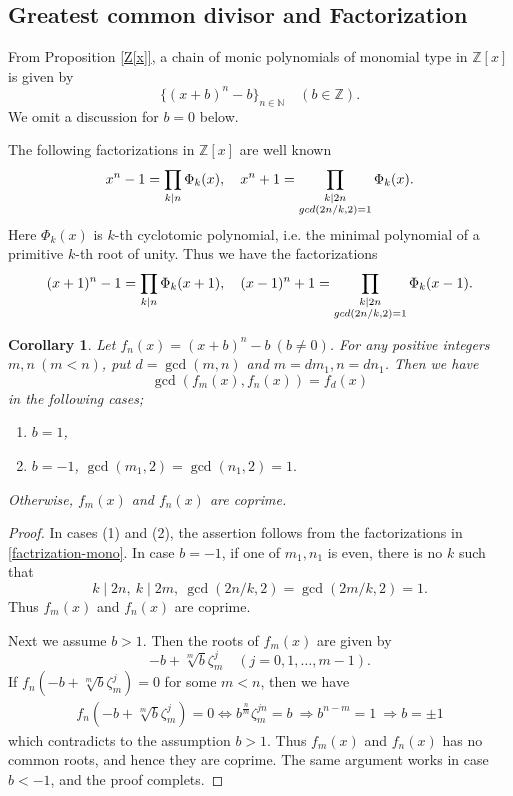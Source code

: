 \documentclass[a4paper, 11pt]{amsart}
\numberwithin{equation}{section}
\newtheorem{cor}[thm]{Corollary}
\theoremstyle{definition}
\newcommand{\Z}{\mathbb{Z}}
\newcommand{\N}{\mathbb{N}}
\begin{document}


\subsection{Greatest common divisor and Factorization}

From Proposition \ref{Z[x]}, a chain of monic polynomials of monomial type in $\Z[x]$ is given by
\[
\{(x+b)^n-b\}_{n\in \N}\quad (b\in \Z).
\]
We omit a discussion for $b=0$ below.

The following factorizations in $\Z[x]$ are well known 
\begin{equation*}
x^n-1 = \prod_{k \mid n} \Phi_k(x),\quad x^n+1 = \prod_{\substack{k\mid 2n \\ {\rm gcd} (2n/k, 2) = 1}} \Phi_k(x).
\end{equation*}
Here $\Phi_k(x)$ is $k$-th cyclotomic polynomial, i.e. the minimal polynomial of a  primitive $k$-th root of unity.
Thus we have the factorizations 
\begin{align}\label{factrization-mono}
(x+1)^n-1=\prod_{k \mid n} \Phi_k(x+1),\quad (x-1)^n+1=\prod_{\substack{k\mid 2n \\ {\rm gcd} (2n/k, 2) = 1}} \Phi_k(x-1).
\end{align}

\begin{cor}\label{gcd-mono}
Let $f_n(x)=(x+b)^n-b\ (b\neq 0)$.
For any positive integers $m, n\ (m<n)$, put $d=\gcd(m,n)$ and $m=dm_1, n=dn_1$.
Then we have
\[
\gcd(f_m(x), f_n(x))
=
f_d(x)
\]
in the following cases;
\begin{enumerate}[{\rm (1)}]
\item
$b=1$,

\item
$b=-1$, $\gcd(m_1,2)=\gcd(n_1,2)=1.$
\end{enumerate}
Otherwise, $f_m(x)$ and $f_n(x)$ are coprime.
\end{cor}


\begin{proof}
In cases (1) and (2), the assertion follows from the factorizations in \eqref{factrization-mono}.
In case $b=-1$, if one of $m_1, n_1$ is even, there is no $k$ such that
\[
k\mid 2n,\ k\mid 2m,\  \gcd(2n/k,2)=\gcd(2m/k,2)=1.
\]
Thus $f_m(x)$ and $f_n(x)$ are coprime.

Next we assume $b>1$.
Then the roots of $f_m(x)$ are given by
\[
-b+\sqrt[m]{b}\zeta_m^j\quad (j=0,1,\dots,m-1).
\]
If $f_n(-b+\sqrt[m]{b}\zeta_m^j)=0$ for some $m<n$, then we have
\begin{align*}
f_n(-b+\sqrt[m]{b}\zeta_m^j)=0
\iff 
b^{\frac nm}\zeta_m^{jn}=b
\ \Longrightarrow
b^{n-m}=1
\ \Longrightarrow
b=\pm1
\end{align*}
which contradicts to the assumption $b>1$.
Thus $f_m(x)$ and $f_n(x)$ has no common roots, and hence they are coprime.
The same argument works in case $b<-1$, and the proof complets.
\end{proof}
\end{document}
